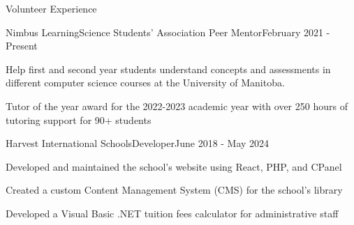\documentclass{article}
\newlength{\tabin}
\newlength{\secsep}
\newcommand{\lineunder}{\vspace*{-8pt} \\ \hspace*{-6pt} \hrulefill \\ \vspace*{-15pt}}
\newenvironment{tabbedsection}[1]{
	\begin{list}{}{
		\setlength{\itemsep}{0pt}
		\setlength{\labelsep}{0pt}
		\setlength{\labelwidth}{0pt}
		\setlength{\leftmargin}{\tabin}
		\setlength{\rightmargin}{\tabin}
		\setlength{\listparindent}{0pt}
		\setlength{\parsep}{0pt}
		\setlength{\parskip}{0pt}
		\setlength{\partopsep}{0pt}
		\setlength{\topsep}{#1}
	}
		\item[]
		}{
	\end{list}}
\newenvironment{resume_section}[1]{
	\vspace{2\secsep}
	\textsc{\large#1}
	\lineunder
	\begin{tabbedsection}{\secsep}
	}{\end{tabbedsection}}
\newenvironment{subitems}{
	\renewcommand{\labelitemi}{-}
	\begin{itemize}
		\setlength{\labelsep}{1em}
		}{
	\end{itemize}}
\newenvironment{resume_employer}[4]{
	\vspace{\secsep}
	\begin{minipage}[t]{0.75\linewidth}
		\textbf{#1}\\
		\small #2
	\end{minipage}%
	\begin{minipage}[t]{0.25\linewidth}
		\hfill \footnotesize #4
	\end{minipage}
	\vspace{0.1em}\\
	\begin{tabbedsection}{0pt}
		\begin{subitems}
		}{\end{subitems}
	\end{tabbedsection}}
\begin{document}
	\begin{resume_section}{Volunteer Experience}
		\begin{resume_employer}{Nimbus Learning}{Science Students' Association Peer Mentor}{}{February 2021 - Present}
			\item Help first and second year students understand concepts and assessments in different computer
			science courses at the University of Manitoba.
			\item Tutor of the year award for the 2022-2023 academic year with over 250 hours of tutoring support for 90+ students
		\end{resume_employer}
		
		\begin{resume_employer}{Harvest International Schools}{Developer}{}{June 2018 - May 2024}
			\item Developed and maintained the school's website using React, PHP, and CPanel
			\item Created a custom Content Management System (CMS) for the school's library
			\item Developed a Visual Basic .NET tuition fees calculator for administrative staff
		\end{resume_employer}
	\end{resume_section}
\end{document}
